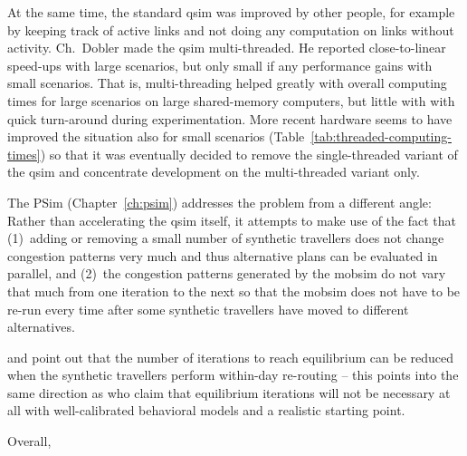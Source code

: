 At the same time, the standard \gls{qsim} was improved by other people, for example by keeping track of active links and not doing any computation on links without activity.  Ch.~Dobler made the \gls{qsim} multi-threaded.  He reported \citep[][Chapter~5]{Dobler_PhDThesis_2013} close-to-linear speed-ups with large scenarios, but only small if any performance gains with small scenarios.  That is, multi-threading helped greatly with overall computing times for large scenarios on large shared-memory computers, but little with with quick turn-around during experimentation.  More recent hardware seems to have improved the situation also for small scenarios (Table~\ref{tab:threaded-computing-times}) so that it was eventually decided to remove the single-threaded variant of the \gls{qsim} and concentrate development on the multi-threaded variant only.  


The PSim (Chapter~\ref{ch:psim}) addresses the problem from a different angle: Rather than accelerating the \gls{qsim} itself, it attempts to make use of the fact that (1)~adding or removing a small number of synthetic travellers does not change congestion patterns very much and thus alternative plans can be evaluated in parallel, and (2)~the congestion patterns generated by the \gls{mobsim} do not vary that much from one iteration to the next so that the \gls{mobsim} does not have to be re-run every time after some synthetic travellers have moved to different alternatives.

\cite{MaerkiEtAl_Transportation_2014} and \cite{Dobler_PhDThesis_2013} point out that the number of iterations to reach equilibrium can be reduced when the synthetic travellers perform within-day re-routing -- this points into the same direction as \cite{LuEtcBenAkiva2015SimMobility} who claim that equilibrium iterations will not be necessary at all with well-calibrated behavioral models and a realistic starting point.

Overall, 



